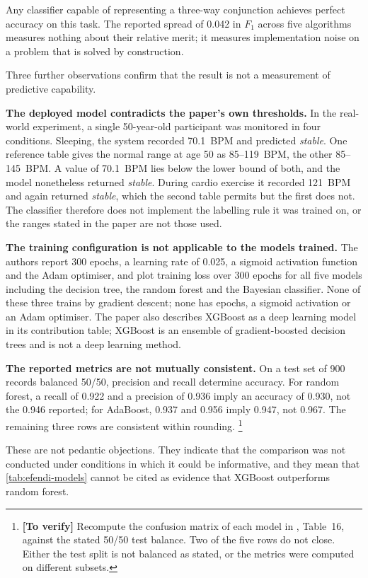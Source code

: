 \documentclass[12pt,a4paper,oneside]{report}
\newcommand{\verify}[1]{\footnote{\textbf{[To verify]} #1}}
\begin{document}
Any classifier capable of representing a three-way conjunction achieves perfect accuracy on this task. The reported spread of 0.042 in $F_1$ across five algorithms measures nothing about their relative merit; it measures implementation noise on a problem that is solved by construction.

Three further observations confirm that the result is not a measurement of predictive capability.

\textbf{The deployed model contradicts the paper's own thresholds.} In the real-world experiment, a single 50-year-old participant was monitored in four conditions. Sleeping, the system recorded 70.1~BPM and predicted \emph{stable}. One reference table gives the normal range at age 50 as 85--119~BPM, the other 85--145~BPM. A value of 70.1~BPM lies below the lower bound of both, and the model nonetheless returned \emph{stable}. During cardio exercise it recorded 121~BPM and again returned \emph{stable}, which the second table permits but the first does not. The classifier therefore does not implement the labelling rule it was trained on, or the ranges stated in the paper are not those used.

\textbf{The training configuration is not applicable to the models trained.} The authors report 300 epochs, a learning rate of 0.025, a sigmoid activation function and the Adam optimiser, and plot training loss over 300 epochs for all five models including the decision tree, the random forest and the Bayesian classifier. None of these three trains by gradient descent; none has epochs, a sigmoid activation or an Adam optimiser. The paper also describes XGBoost as a deep learning model in its contribution table; XGBoost is an ensemble of gradient-boosted decision trees and is not a deep learning method.

\textbf{The reported metrics are not mutually consistent.} On a test set of 900 records balanced 50/50, precision and recall determine accuracy. For random forest, a recall of 0.922 and a precision of 0.936 imply an accuracy of 0.930, not the 0.946 reported; for AdaBoost, 0.937 and 0.956 imply 0.947, not 0.967. The remaining three rows are consistent within rounding.%
\verify{Recompute the confusion matrix of each model in \textcite{efendi2025}, Table~16, against the stated 50/50 test balance. Two of the five rows do not close. Either the test split is not balanced as stated, or the metrics were computed on different subsets.}

These are not pedantic objections. They indicate that the comparison was not conducted under conditions in which it could be informative, and they mean that \cref{tab:efendi-models} cannot be cited as evidence that XGBoost outperforms random forest.
\end{document}
